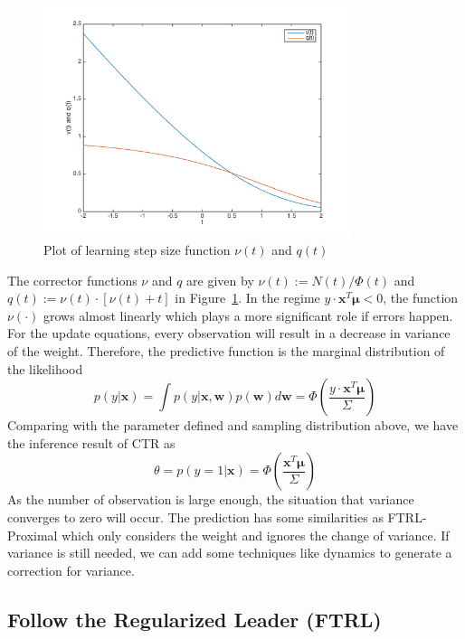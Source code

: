 \begin{figure}[htbp]
\centering
\includegraphics[width=0.8\textwidth]{vandq.png}
\caption{Plot of learning step size function $\nu(t)$ and $q(t)$}
\label{fig:vandq}
\end{figure}

The corrector functions $\nu$ and $q$ are given by $\nu(t):=N(t)/\Phi(t)$ and $q(t):=\nu (t)\cdot [\nu (t)+t]$ in Figure~\ref{fig:vandq}. In the regime $y \cdot \mathbf{x}^{T}\bm{\mu}<0$, the function $\nu(\cdot)$ grows almost linearly which plays a more significant role if errors happen. For the update equations, every observation will result in a decrease in variance of the weight. Therefore, the predictive function is the marginal distribution of the likelihood
\begin{equation}
p(y|\mathbf{x})=\int p(y|\mathbf{x},\mathbf{w})p(\mathbf{w})d\mathbf{w}=\Phi (\frac{y\cdot \mathbf{x}^{T}\bm{\mu}}{\Sigma })
\end{equation}
Comparing with the parameter defined and sampling distribution above, we have the inference result of CTR as
\begin{equation}
\theta=p(y=1|\mathbf{x})=\Phi (\frac{\mathbf{x}^{T}\bm{\mu}}{\Sigma })
\end{equation}
As the number of observation is large enough, the situation that variance converges to zero will occur. The prediction has some similarities as FTRL-Proximal which only considers the weight and ignores the change of variance. If variance is still needed, we can add some techniques like dynamics to generate a correction for variance.

\subsection{Follow the Regularized Leader (FTRL)}

